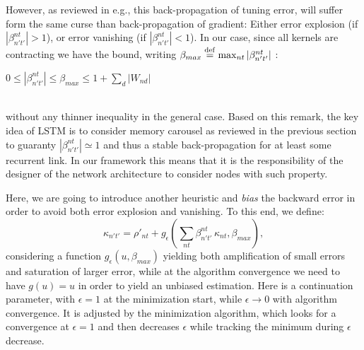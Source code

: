 However, as reviewed in e.g., \cite{Hochreiter:1997} this back-propagation of tuning error, will suffer form the same curse than back-propagation of gradient: Either error explosion (if $|\beta_{n't'}^{nt}| > 1$), or error vanishing (if $|\beta_{n't'}^{nt}| < 1$). In our case, since all kernels are contracting we have the bound, writing $\beta_{max} \stackrel {\rm def}{=} \max_{nt} |\beta_{n't'}^{nt}|$ :
\\\centerline{$0 \leq \left|\beta_{n't'}^{nt}\right| \leq \beta_{max} \leq 1 + \sum_d |W_{nd}|$}\\
without any thinner inequality in the general case. Based on this remark, the key idea of LSTM \cite{Hochreiter:1997} is to consider memory carousel as reviewed in the previous section to guaranty $\left|\beta_{n't'}^{nt}\right| \simeq 1$ and thus a stable back-propagation for at least some recurrent link. In our framework this means that it is the responsibility of the designer of the network architecture to consider nodes with such property.

Here, we are going to introduce another heuristic and {\em bias} the backward error in order to avoid both error explosion and vanishing. To this end, we define:
\begin{equation} \label{kappa}
\kappa_{n't'} = \rho'_{nt} + g_{\epsilon}\left(\sum_{nt} \beta_{n't'}^{nt} \, \kappa_{nt}, \beta_{max}\right),
\end{equation} considering a function $g_{\epsilon}(u, \beta_{max})$ yielding both amplification of small errors and saturation of larger error, while at the algorithm convergence we need to have $g(u) = u$ in order to yield an unbiased estimation. Here is a continuation parameter, with $\epsilon = 1$ at the minimization start, while $\epsilon \rightarrow 0$ with algorithm convergence. It is adjusted by the minimization algorithm, which looks for a convergence at $\epsilon = 1$ and then decreases $\epsilon$ while tracking the minimum during $\epsilon$ decrease.

